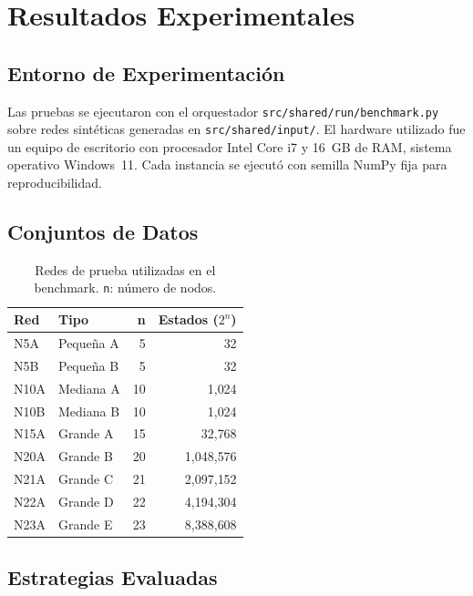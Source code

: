 \section{Resultados Experimentales}
\label{sec:resultados}

\subsection{Entorno de Experimentación}

Las pruebas se ejecutaron con el orquestador \texttt{src/shared/run/benchmark.py} sobre redes sintéticas generadas en \texttt{src/shared/input/}. El hardware utilizado fue un equipo de escritorio con procesador Intel Core i7 y 16~GB de RAM, sistema operativo Windows~11. Cada instancia se ejecutó con semilla NumPy fija para reproducibilidad.

\subsection{Conjuntos de Datos}

\begin{table}[H]
    \centering
    \caption{Redes de prueba utilizadas en el benchmark. \texttt{n}: número de nodos.}
    \label{tab:datasets}
    \begin{tabular}{llrr}
        \toprule
        \textbf{Red} & \textbf{Tipo} & \textbf{n} & \textbf{Estados ($2^n$)} \\
        \midrule
        N5A   & Pequeña A  & 5  & 32 \\
        N5B   & Pequeña B  & 5  & 32 \\
        N10A  & Mediana A  & 10 & 1{,}024 \\
        N10B  & Mediana B  & 10 & 1{,}024 \\
        N15A  & Grande A   & 15 & 32{,}768 \\
        N20A  & Grande B   & 20 & 1{,}048{,}576 \\
        N21A  & Grande C   & 21 & 2{,}097{,}152 \\
        N22A  & Grande D   & 22 & 4{,}194{,}304 \\
        N23A  & Grande E   & 23 & 8{,}388{,}608 \\
        \bottomrule
    \end{tabular}
\end{table}

\subsection{Estrategias Evaluadas}

